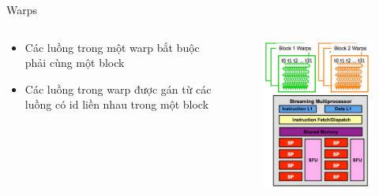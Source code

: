 \documentclass[10pt]{beamer}
\theoremstyle{remark}
\numberwithin{algocf}{section}
\numberwithin{equation}{section}
\numberwithin{dl}{section}
\numberwithin{figure}{section}
\begin{document}
\begin{frame}{Warps}
    \begin{columns}[onlytextwidth]
        \begin{column}{0.5\linewidth}
            \begin{itemize}
                \item Các luồng trong một warp bắt buộc phải cùng một block 
                \item Các luồng trong warp được gán từ các luồng có id liền nhau trong một block 
            \end{itemize}
        \end{column}\begin{column}{0.5\linewidth}
                \begin{figure}[H]
                    \centering
                    \includegraphics[width=0.8\linewidth]{figures/CUDA/SIMT_Warps.png}
                \end{figure}
        \end{column}
    \end{columns}
\end{frame}
\end{document}
